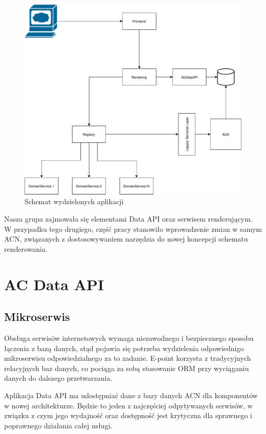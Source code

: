 \documentclass[licencjacka]{pracamgr}
\begin{document}
\begin{figure}\label{architektura}
	\centering
	\includegraphics[scale=0.82]{architecture.pdf}
	\caption{Schemat wydzielonych aplikacji}
\end{figure}

Nasza grupa zajmowała się elementami Data API oraz serwisem renderującym. W przypadku tego drugiego, część pracy stanowiło wprowadzenie zmian w samym ACN, związanych z dostosowywaniem narzędzia do nowej koncepcji schematu renderowania.


\chapter{AC Data API}

\section{Mikroserwis}

Obsługa serwisów internetowych wymaga niezawodnego i bezpiecznego sposobu łączenia z bazą danych, stąd pojawia się potrzeba wydzielenia odpowiednigo mikroserwisu odpowiedzialnego za to zadanie. E-point korzysta z tradycyjnych relacyjnych baz danych, co pociąga za sobą stosowanie ORM przy wyciąganiu danych do dalszego przetwarzania.

\vspace{1mm}

Aplikacja Data API ma udostępniać dane z bazy danych ACN dla komponentów w nowej architekturze. Będzie to jeden z najczęściej odpytywanych serwisów, w związku z czym jego wydajność oraz dostępność jest krytyczna dla sprawnego i poprawnego działania całej usługi.
\end{document}
